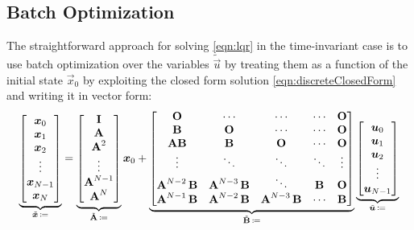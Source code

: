 		\subsection{Batch Optimization}
			\label{subsec:batchOpt}

			The straightforward approach for solving \eqref{eqn:lqr} in the time-invariant case is to use batch optimization over the variables \(\tilde{\vec{u}}\) by treating them as a function of the initial state \(\vec{x}_0\) by exploiting the closed form solution \eqref{eqn:discreteClosedForm} and writing it in vector form:
			\begin{equation}
				\underbrace{\begin{bmatrix}
					\bm{x}_0 \\
					\bm{x}_1 \\
					\bm{x}_2 \\
					\vdots \\
					\bm{x}_{N - 1} \\
					\bm{x}_N
				\end{bmatrix}}_{\tilde{\bm{x}} \,\coloneqq}
				=
				\underbrace{\begin{bmatrix}
					\bm{\mathrm{I}} \\
					\bm{\mathrm{A}} \\
					\bm{\mathrm{A}}^2 \\
					\vdots \\
					\bm{\mathrm{A}}^{N - 1} \\
					\bm{\mathrm{A}}^N
				\end{bmatrix}}_{\tilde{\bm{\mathrm{A}}} \,\coloneqq}
				\bm{x}_0
				+
				\underbrace{\begin{bmatrix}
					\bm{\mathrm{O}}                   & \cdots                    & \cdots                    & \cdots  & \bm{\mathrm{O}} \\
					\bm{\mathrm{B}}                   & \bm{\mathrm{O}}                   & \cdots                    & \cdots  & \bm{\mathrm{O}} \\
					\bm{\mathrm{A}} \bm{\mathrm{B}}           & \bm{\mathrm{B}}                   & \bm{\mathrm{O}}                   & \cdots  & \bm{\mathrm{O}} \\
					\vdots                    & \ddots                    & \ddots                    & \ddots  & \vdots  \\
					\bm{\mathrm{A}}^{N - 2}\, \bm{\mathrm{B}} & \bm{\mathrm{A}}^{N - 3}\, \bm{\mathrm{B}} & \ddots                    & \bm{\mathrm{B}} & \bm{\mathrm{O}} \\
					\bm{\mathrm{A}}^{N - 1}\, \bm{\mathrm{B}} & \bm{\mathrm{A}}^{N - 2}\, \bm{\mathrm{B}} & \bm{\mathrm{A}}^{N - 3}\, \bm{\mathrm{B}} & \cdots  & \bm{\mathrm{B}}
				\end{bmatrix}}_{\tilde{\bm{\mathrm{B}}} \,\coloneqq}
				\underbrace{\begin{bmatrix}
					\bm{u}_0 \\
					\bm{u}_1 \\
					\bm{u}_2 \\
					\vdots \\
					\bm{u}_{N - 1}
				\end{bmatrix}}_{\tilde{\bm{u}} \,\coloneqq}
			\end{equation}
